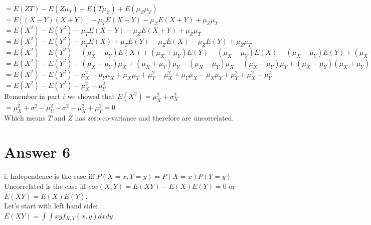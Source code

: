 \documentclass[12pt]{article}
\begin{document}
$=  E(ZT) -E(Z\mu_T) - E(T\mu_Z) +E(\mu_Z\mu_T)   $ \\

$ = E[ (X-Y)(X+Y) ] - \mu_TE(X-Y) - \mu_ZE(X+Y) + \mu_Z\mu_T  $ \\

$ = E(X^2) - E(Y^2  ) - \mu_TE(X-Y) - \mu_ZE(X+Y) + \mu_Z\mu_T   $ \\ 

$ = E(X^2) - E(Y^2  ) - \mu_TE(X) + \mu_TE(Y)- \mu_ZE(X) - \mu_ZE(Y) + \mu_Z\mu_T   $ \\ 

$ = E(X^2) - E(Y^2  ) - (\mu_X + \mu_Y)E(X) + (\mu_X + \mu_Y) E(Y)- (\mu_X - \mu_Y) E(X) - (\mu_X - \mu_Y) E(Y) + (\mu_X - \mu_Y)(\mu_X + \mu_Y)   $ \\ 

$ = E(X^2) - E(Y^2  ) - (\mu_X + \mu_Y) \mu_X+ (\mu_X + \mu_Y) \mu_Y- (\mu_X - \mu_Y) \mu_X - (\mu_X - \mu_Y) \mu_Y + (\mu_X - \mu_Y)(\mu_X + \mu_Y)   $ \\ 

$ = E(X^2) - E(Y^2  ) - \mu_X^2 - \mu_Y\mu_X+ \mu_X\mu_Y + \mu_Y^2  -\mu_X^2 +\mu_Y\mu_X    -\mu_X\mu_Y  + \mu_Y^2 +        \mu_X^2 - \mu_Y^2 $ \\ 

$ = E(X^2) - E(Y^2  ) - \mu_X^2 + \mu_Y^2  $ \\ 

Remember in part $i$ we showed that $E(X^2) = \mu_X^2 + \sigma_X^2$  \\

$ = \mu_X^2 + \sigma^2 - \mu_Y^2 - \sigma^2 - \mu_X^2 + \mu_Y^2 = 0 $ \\

Which means $T$ and $Z$ has zero co-variance and therefore are uncorrelated.\\

\section*{Answer 6}

\quad i. Independence is the case iff $P(X=x,Y=y)=P(X=x)P(Y=y) $ \\

Uncorrelated is the case iff $cov(X,Y) = E(XY) - E(X)E(Y) = 0$ or $E(XY) = E(X)E(Y) $. \\

Let's start with left hand side: \\

$E(XY) = \displaystyle \int \int xyf_{X,Y}(x,y)dxdy $ \\
\end{document}
